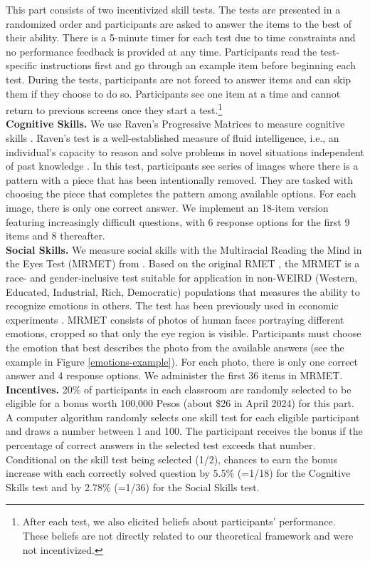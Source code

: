 \documentclass[11pt,a4paper,oneside]{article}
\begin{document}
This part consists of two incentivized skill tests. The tests are presented in a randomized order and participants are asked to answer the items to the best of their ability. There is a 5-minute timer for each test due to time constraints and no performance feedback is provided at any time. Participants read the test-specific instructions first and go through an example item before beginning each test. During the tests, participants are not forced to answer items and can skip them if they choose to do so. Participants see one item at a time and cannot return to previous screens once they start a test.\footnote{After each test, we also elicited beliefs about participants' performance. These beliefs are not directly related to our theoretical framework and were not incentivized.} \medskip\\
\textbf{Cognitive Skills.} We use Raven's Progressive Matrices to measure cognitive skills \citep{raven_performances_1936, raven_standard_1976}. Raven’s test is a well-established measure of fluid intelligence, i.e., an individual’s capacity to reason and solve problems in novel situations independent of past knowledge \citep{schilbach_psychological_2016}. In this test, participants see series of images where there is a pattern with a piece that has been intentionally removed. They are tasked with choosing the piece that completes the pattern among available options. For each image, there is only one correct answer. We implement an 18-item version featuring increasingly difficult questions, with 6 response options for the first 9 items and 8 thereafter.  \medskip\\
\textbf{Social Skills.} We measure social skills with the Multiracial Reading the Mind in the Eyes Test (MRMET) from \citet{kim_multiracial_2022}. Based on the original RMET \citep{baron-cohen_reading_2001}, the MRMET is a race- and gender-inclusive test suitable for application in non-WEIRD (Western, Educated, Industrial, Rich, Democratic) populations that measures the ability to recognize emotions in others. The test has been previously used in economic experiments \citep{van_leeuwen_predictably_2018, weidmann_team_2021}. MRMET consists of photos of human faces portraying different emotions, cropped so that only the eye region is visible. Participants must choose the emotion that best describes the photo from the available answers (see the example in Figure \ref{emotions-example}). For each photo, there is only one correct answer and 4 response options. We administer the first 36 items in MRMET.  \medskip\\
\textbf{Incentives.} 20\% of participants in each classroom are randomly selected to be eligible for a bonus worth 100,000 Pesos (about \$26 in April 2024) for this part. A computer algorithm randomly selects one skill test for each eligible participant and draws a number between 1 and 100. The participant receives the bonus if the percentage of correct answers in the selected test exceeds that number. Conditional on the skill test being selected (1/2), chances to earn the bonus increase with each correctly solved question by 5.5\% (=1/18) for the Cognitive Skills test and by 2.78\% (=1/36) for the Social Skills test.
\end{document}
